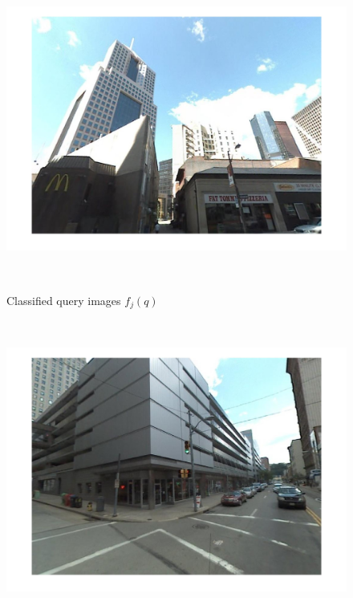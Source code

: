 \begin{figure}[]
\begin{minipage}{0.48\linewidth}
\begin{minipage}{\wii}
            \includegraphics[width=\linewidth]{imgs/wVS3q/2932/j.jpg}
          \end{minipage}  
          \vspace{3mm}
          \\
          \centerline{\scriptsize Classified query images $f_j(q)$} 
          \\
          \begin{minipage}{\wii}
            \centering
            \includegraphics[width=\linewidth]{imgs/wVS3q/2932/a.jpg}
          \end{minipage}  
          \begin{minipage}{\wii}
            \centering

\end{minipage}
\end{minipage}
\end{figure}
